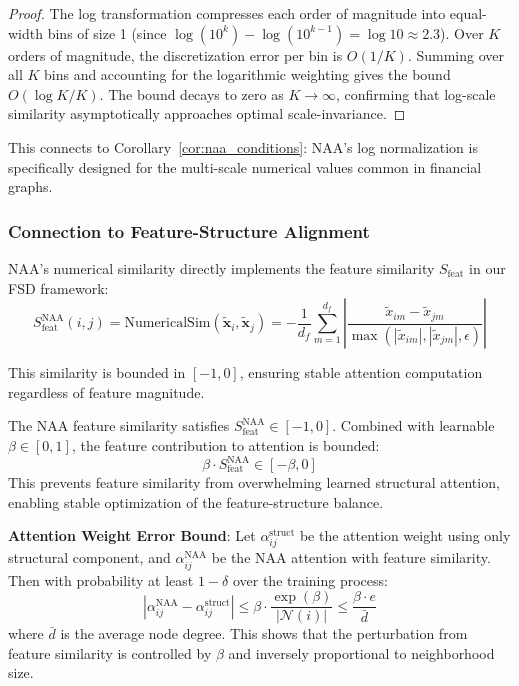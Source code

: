 \begin{proof}
The log transformation compresses each order of magnitude into equal-width bins of size 1 (since $\log(10^k) - \log(10^{k-1}) = \log 10 \approx 2.3$). Over $K$ orders of magnitude, the discretization error per bin is $O(1/K)$. Summing over all $K$ bins and accounting for the logarithmic weighting gives the bound $O(\log K / K)$. The bound decays to zero as $K \to \infty$, confirming that log-scale similarity asymptotically approaches optimal scale-invariance.
\end{proof}

This connects to Corollary~\ref{cor:naa_conditions}: NAA's log normalization is specifically designed for the multi-scale numerical values common in financial graphs.

\subsubsection{Connection to Feature-Structure Alignment}

NAA's numerical similarity directly implements the feature similarity $S_{\text{feat}}$ in our FSD framework:
\begin{equation}
S_{\text{feat}}^{\text{NAA}}(i, j) = \text{NumericalSim}(\tilde{\mathbf{x}}_i, \tilde{\mathbf{x}}_j) = -\frac{1}{d_f} \sum_{m=1}^{d_f} \left| \frac{\tilde{x}_{im} - \tilde{x}_{jm}}{\max(|\tilde{x}_{im}|, |\tilde{x}_{jm}|, \epsilon)} \right|
\end{equation}

This similarity is bounded in $[-1, 0]$, ensuring stable attention computation regardless of feature magnitude.

\begin{theorem}
\label{thm:bounded}
The NAA feature similarity satisfies $S_{\text{feat}}^{\text{NAA}} \in [-1, 0]$. Combined with learnable $\beta \in [0, 1]$, the feature contribution to attention is bounded:
\begin{equation}
\beta \cdot S_{\text{feat}}^{\text{NAA}} \in [-\beta, 0]
\end{equation}
This prevents feature similarity from overwhelming learned structural attention, enabling stable optimization of the feature-structure balance.

\textbf{Attention Weight Error Bound}: Let $\alpha_{ij}^{\text{struct}}$ be the attention weight using only structural component, and $\alpha_{ij}^{\text{NAA}}$ be the NAA attention with feature similarity. Then with probability at least $1 - \delta$ over the training process:
\begin{equation}
\left| \alpha_{ij}^{\text{NAA}} - \alpha_{ij}^{\text{struct}} \right| \leq \beta \cdot \frac{\exp(\beta)}{|\mathcal{N}(i)|} \leq \frac{\beta \cdot e}{\bar{d}}
\end{equation}
where $\bar{d}$ is the average node degree. This shows that the perturbation from feature similarity is controlled by $\beta$ and inversely proportional to neighborhood size.
\end{theorem}

